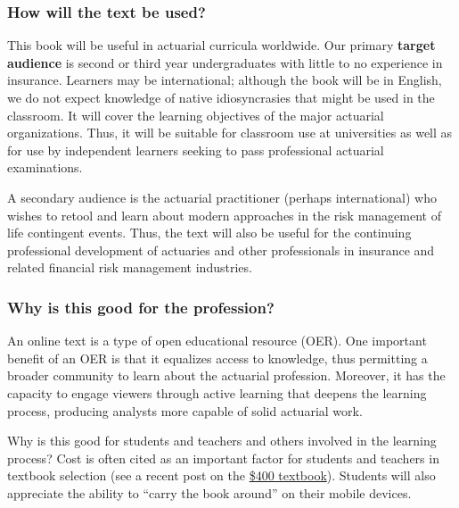 \documentclass[
]{book}
\begin{document}
\hypertarget{how-will-the-text-be-used}{%
\subsubsection*{How will the text be used?}\label{how-will-the-text-be-used}}

This book will be useful in actuarial curricula worldwide. Our primary \textbf{target audience} is second or third year undergraduates with little to no experience in insurance. Learners may be international; although the book will be in English, we do not expect knowledge of native idiosyncrasies that might be used in the classroom. It will cover the learning objectives of the major actuarial organizations. Thus, it will be suitable for classroom use at universities as well as for use by independent learners seeking to pass professional actuarial examinations.

A secondary audience is the actuarial practitioner (perhaps international) who wishes to retool and learn about modern approaches in the risk management of life contingent events. Thus, the text will also be useful for the continuing professional development of actuaries and other professionals in insurance and related financial risk management industries.

\hypertarget{why-is-this-good-for-the-profession}{%
\subsubsection*{Why is this good for the profession?}\label{why-is-this-good-for-the-profession}}

An online text is a type of open educational resource (OER). One important benefit of an OER is that it equalizes access to knowledge, thus permitting a broader community to learn about the actuarial profession. Moreover, it has the capacity to engage viewers through active learning that deepens the learning process, producing analysts more capable of solid actuarial work.

Why is this good for students and teachers and others involved in the learning process? Cost is often cited as an important factor for students and teachers in textbook selection (see a recent post on the \href{https://www.aei.org/publication/the-new-era-of-the-400-college-textbook-which-is-part-of-the-unsustainable-higher-education-bubble/}{\$400 textbook}). Students will also appreciate the ability to ``carry the book around'' on their mobile devices.
\end{document}
